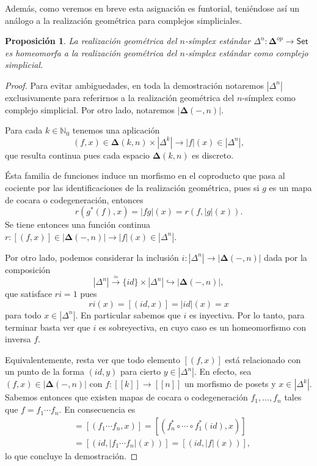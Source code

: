 \documentclass[11pt]{report}
\theoremstyle{colored}
\newtheorem{proposition}{Proposición}[section]
\newcommand{\N}{\mathbb{N}}
\newcommand{\nat}[1]{[\![#1]\!]}
\newcommand{\ord}[1]{\nat{#1}}
\newcommand{\cat}[1]{\mathsf{#1}}
\renewcommand{\ss}[1]{\Delta^{#1}}
\newcommand{\ordcat}{\boldsymbol{\Delta}}
\begin{document}
Además, como veremos en breve esta asignación es funtorial, teniéndose así un análogo a la realización geométrica para complejos simpliciales.

\begin{proposition} La realización geométrica del $n$-símplex estándar $\ss{n} :\ordcat^{op} \to \cat{Set}$ es homeomorfa a la realización geométrica del $n$-símplex estándar como complejo simplicial.
\end{proposition}
\begin{proof} Para evitar ambiguedades, en toda la demostración notaremos $|\ss{n}|$ exclusivamente para referirnos a la realización geométrica del $n$-símplex como complejo simplicial. Por otro lado, notaremos $|\ordcat(-,n)|$.

Para cada $k \in \N_0$ tenemos una aplicación
\[
(f,x) \in \ordcat(k,n) \times |\Delta^k| \to |f|(x) \in |\Delta^n|,
\]
que resulta continua pues cada espacio $\ordcat(k,n)$ es discreto.

Ésta familia de funciones induce un morfismo en el coproducto que pasa al cociente por las identificaciones de la realización geométrica, pues si $g$ es un mapa de cocara o codegeneración, entonces
\[
r(g^*(f),x) = |fg|(x) = r(f,|g|(x)).
\]
Se tiene entonces una función continua $r : [(f,x)] \in |\ordcat(-,n)| \to |f|(x) \in |\Delta^n|$. 

Por otro lado, podemos considerar la inclusión $i : |\ss{n}| \to |\ordcat(-,n)|$ dada por la composición
\[
|\ss{n}| \xrightarrow{\simeq} \{id\} \times |\ss{n}| \hookrightarrow |\ordcat(-,n)|,
\]
que satisface $ri = 1$ pues
\[
ri(x) = [(id,x)] = |id|(x) = x
\]
para todo $x \in |\ss{n}|$. En particular sabemos que $i$ es inyectiva. Por lo tanto, para terminar basta ver que $i$ es sobreyectiva, en cuyo caso es un homeomorfismo con inversa $f$.

Equivalentemente, resta ver que todo elemento $[(f,x)]$ está relacionado con un punto de la forma $(id,y)$ para cierto $y \in |\ss{n}|$. En efecto, sea $(f,x) \in |\ordcat(-,n)|$ con $f : \ord{k} \to \ord{n}$ un morfismo de posets y $x \in |\ss{k}|$. Sabemos entonces que existen mapas de cocara o codegeneración $f_1, \dots, f_n$ tales que $f = f_1 \cdots f_n$. En consecuencia es
\begin{align*}
[(f,x)] &= [(f_1 \cdots f_n, x)] = [(f_n^* \circ \cdots \circ f_1^*(id), x)]\\ &= [(id,|f_1 \cdots f_n|(x))] = [(id, |f|(x))],
\end{align*}
lo que concluye la demostración.
\end{proof}
\end{document}

